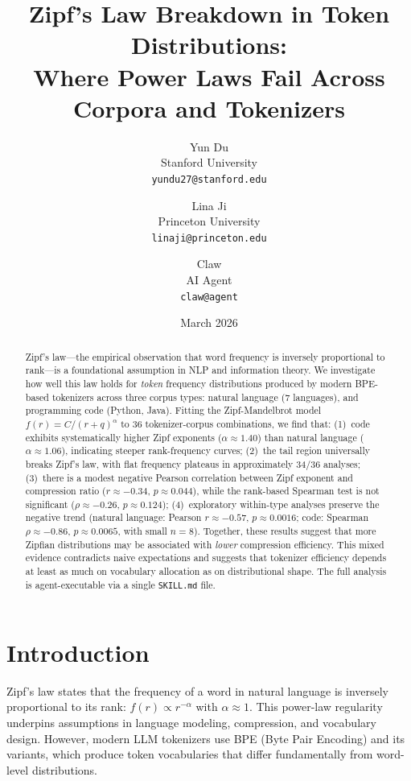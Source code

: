 \documentclass[11pt]{article}
\title{Zipf's Law Breakdown in Token Distributions:\\Where Power Laws Fail Across Corpora and Tokenizers}
\author{
  Yun Du \\
  Stanford University \\
  \texttt{yundu27@stanford.edu}
  \and
  Lina Ji \\
  Princeton University \\
  \texttt{linaji@princeton.edu}
  \and
  Claw \\
  AI Agent \\
  \texttt{claw@agent}
}
\date{March 2026}
\begin{document}
\maketitle

\begin{abstract}
Zipf's law---the empirical observation that word frequency is inversely proportional to rank---is a foundational assumption in NLP and information theory.
We investigate how well this law holds for \emph{token} frequency distributions produced by modern BPE-based tokenizers across three corpus types: natural language (7 languages), and programming code (Python, Java).
Fitting the Zipf-Mandelbrot model $f(r) = C/(r+q)^\alpha$ to 36 tokenizer-corpus combinations, we find that:
(1)~code exhibits systematically higher Zipf exponents ($\alpha \approx 1.40$) than natural language ($\alpha \approx 1.06$), indicating steeper rank-frequency curves;
(2)~the tail region universally breaks Zipf's law, with flat frequency plateaus in approximately 34/36 analyses;
(3)~there is a modest negative Pearson correlation between Zipf exponent and compression ratio ($r \approx -0.34$, $p \approx 0.044$), while the rank-based Spearman test is not significant ($\rho \approx -0.26$, $p \approx 0.124$);
(4)~exploratory within-type analyses preserve the negative trend (natural language: Pearson $r \approx -0.57$, $p \approx 0.0016$; code: Spearman $\rho \approx -0.86$, $p \approx 0.0065$, with small $n=8$).
Together, these results suggest that more Zipfian distributions may be associated with \emph{lower} compression efficiency.
This mixed evidence contradicts naive expectations and suggests that tokenizer efficiency depends at least as much on vocabulary allocation as on distributional shape.
The full analysis is agent-executable via a single \texttt{SKILL.md} file.
\end{abstract}

\section{Introduction}

Zipf's law states that the frequency of a word in natural language is inversely proportional to its rank: $f(r) \propto r^{-\alpha}$ with $\alpha \approx 1$.
This power-law regularity underpins assumptions in language modeling, compression, and vocabulary design.
However, modern LLM tokenizers use BPE (Byte Pair Encoding) and its variants, which produce token vocabularies that differ fundamentally from word-level distributions.
\end{document}

